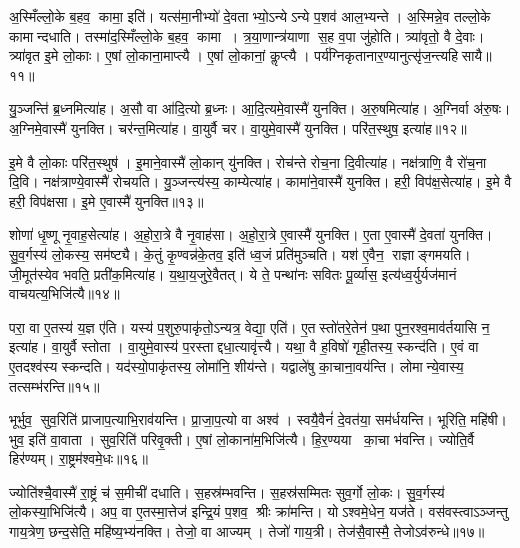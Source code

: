 अ॒स्मिँल्लो॒के ब॒हव॒ कामा॒ इति॑।
यत्स॑मा॒नीभ्यो॑ दे॒वताभ्यो॒ऽन्येऽन्ये प॒शव॑ आल॒भ्यन्ते।
अ॒स्मिन्ने॒व तल्लो॒के कामान्दधाति।
तस्मा॑द॒स्मिँल्लो॒के ब॒हव॒ कामा।
त्र॒या॒णान्त्र॑याणा स॒ह व॒पा जु॑होति।
त्र्या॑वृतो॒ वै दे॒वाः।
त्र्या॑वृत इ॒मे लो॒काः।
ए॒षां लो॒काना॒माप्त्यै।
ए॒षां लो॒कानां॒ कॢप्त्यै।
पर्य॑ग्निकृतानार॒ण्यानुत्सृ॑ज॒न्त्यहिसायै॥११॥\anuvakamend[अव॑रुद्ध्या उ॒भयान्प॒शूनाल॑भते स॒त्यादहिसायै]

यु॒ञ्जन्ति॑ ब्र॒ध्नमित्या॑ह।
अ॒सौ वा आ॑दि॒त्यो ब्र॒ध्नः।
आ॒दि॒त्यमे॒वास्मै॑ युनक्ति।
अ॒रु॒षमित्या॑ह।
अ॒ग्निर्वा अ॑रु॒षः।
अ॒ग्निमे॒वास्मै॑ युनक्ति।
चर॑न्त॒मित्या॑ह।
वा॒युर्वै चर\sn{}।
वा॒युमे॒वास्मै॑ युनक्ति।
परि॑त॒स्थुष॒ इत्या॑ह॥१२॥

इ॒मे वै लो॒काः परि॑त॒स्थुष॑।
इ॒माने॒वास्मै॑ लो॒कान् यु॑नक्ति।
रोच॑न्ते रोच॒ना दि॒वीत्या॑ह।
नक्ष॑त्राणि॒ वै रो॑च॒ना दि॒वि।
नक्ष॑त्राण्ये॒वास्मै॑ रोचयति।
यु॒ञ्जन्त्य॑स्य॒ काम्येत्या॑ह।
कामा॑ने॒वास्मै॑ युनक्ति।
हरी॒ विप॑क्ष॒सेत्या॑ह।
इ॒मे वै हरी॒ विप॑क्षसा।
इ॒मे ए॒वास्मै॑ युनक्ति॥१३॥

शोणा॑ धृ॒ष्णू नृ॒वाह॒सेत्या॑ह।
अ॒हो॒रा॒त्रे वै नृ॒वाह॑सा।
अ॒हो॒रा॒त्रे ए॒वास्मै॑ युनक्ति।
ए॒ता ए॒वास्मै॑ दे॒वता॑ युनक्ति।
सु॒व॒र्गस्य॑ लो॒कस्य॒ सम॑ष्ट्यै।
के॒तुं कृ॒ण्वन्न॑के॒तव॒ इति॑ ध्व॒जं प्रति॑मुञ्चति।
यश॑ ए॒वैन॒ राज्ञाङ्गमयति।
जी॒मूत॑स्येव भवति॒ प्रती॑क॒मित्या॑ह।
य॒था॒य॒जुरे॒वैतत्।
ये ते॒ पन्था॑नः सवितः पू॒र्व्यास॒ इत्य॑ध्व॒र्युर्यज॑मानं वाचयत्य॒भिजि॑त्यै॥१४॥

परा॒ वा ए॒तस्य॑ य॒ज्ञ ए॑ति।
यस्य॑ प॒शुरु॒पाकृ॑तो॒ऽन्यत्र॒ वेद्या॒ एति॑।
ए॒तस्तो॑तरे॒तेन॑ प॒था पुन॒रश्व॒माव॑र्तयासि न॒ इत्या॑ह।
वा॒युर्वै स्तोता।
वा॒युमे॒वास्य॑ प॒रस्ताद्दधा॒त्यावृ॑त्त्यै।
यथा॒ वै ह॒विषो॑ गृही॒तस्य॒ स्कन्द॑ति।
ए॒वं वा ए॒तदश्व॑स्य स्कन्दति।
यद॑स्यो॒पाकृ॑तस्य॒ लोमा॑नि॒ शीय॑न्ते।
यद्वाले॑षु का॒चाना॒वय॑न्ति।
लोमान्ये॒वास्य॒ तत्सम्भ॑रन्ति॥१५॥

भूर्भुव॒ सुव॒रिति॑ प्राजाप॒त्याभि॒राव॑यन्ति।
प्रा॒जा॒प॒त्यो वा अश्व॑।
स्वयै॒वैनं॑ दे॒वत॑या॒ सम॑र्धयन्ति।
भूरिति॒ महि॑षी।
भुव॒ इति॑ वा॒वाता।
सुव॒रिति॑ परिवृ॒क्ती।
ए॒षां लो॒काना॑म॒भिजि॑त्यै।
हि॒र॒ण्यया का॒चा भ॑वन्ति।
ज्योति॒र्वै हिर॑ण्यम्।
रा॒ष्ट्रम॑श्वमे॒धः॥१६॥

ज्योति॑श्चै॒वास्मै॑ रा॒ष्ट्रं च॑ स॒मीची॑ दधाति।
स॒हस्र॑म्भवन्ति।
स॒हस्र॑सम्मितः सुव॒र्गो लो॒कः।
सु॒व॒र्गस्य॑ लो॒कस्या॒भिजि॑त्यै।
अप॒ वा ए॒तस्मा॒त्तेज॑ इन्द्रि॒यं प॒शव॒ श्रीः क्रा॑मन्ति।
योऽश्वमे॒धेन॒ यज॑ते।
वस॑वस्त्वाऽञ्जन्तु गाय॒त्रेण॒ छन्द॒सेति॒ महि॑ष्य॒भ्य॑नक्ति।
तेजो॒ वा आज्यम्।
तेजो॑ गाय॒त्री।
तेज॑सै॒वास्मै॒ तेजोऽव॑रुन्धे॥१७॥

